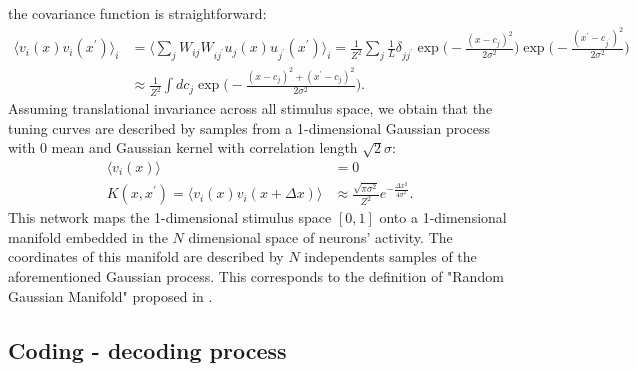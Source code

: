 \documentclass[a4paper]{article}%
\begin{document}
the covariance function is straightforward:
\begin{equation}%
\begin{split}
\langle v_{i}(x)v_{i}(x^{\prime}) \rangle_{i}  & = \Big\langle \sum_{j}
W_{ij}W_{ij^{\prime}} u_{j}(x)u_{j^{\prime}}(x^{\prime}) \Big\rangle_{i} =
\frac{1}{Z^{2}} \sum_{j} \frac{1}{L}\delta_{jj^{\prime}}\exp\Big(-\frac
{(x-c_{j})^{2}}{2\sigma^{2}} \Big) \exp\Big(-\frac{(x^{\prime}-c_{j^{\prime}%
})^{2}}{2\sigma^{2}}\Big)\\
& \approx\frac{1}{Z^{2} } \int dc_{j} \exp\Big(-\frac{(x-c_{j})^{2} +
(x^{\prime}-c_{j})^{2}}{2\sigma^{2}}\Big).
\end{split}
\end{equation}
Assuming translational invariance across all stimulus space, we obtain that
the tuning curves are described by samples from a 1-dimensional Gaussian
process with 0 mean and Gaussian kernel with correlation length $\sqrt
{2}\sigma$:
\begin{equation}%
\begin{split}
\langle v _{i} (x )\rangle & =0\\
K(x,x^{\prime}) = \langle v_{i}(x)v_{i}(x + \Delta x )\rangle & \approx
\frac{\sqrt{\pi\sigma^{2}}}{Z^{2}} e^{-\frac{\Delta x^{2}}{4 \sigma^{2}}}.
\end{split}
\end{equation}
This network maps the 1-dimensional stimulus space $[0,1]$ onto a
1-dimensional manifold embedded in the $N$ dimensional space of neurons'
activity. The coordinates of this manifold are described by $N$ independents
samples of the aforementioned Gaussian process. This corresponds to the
definition of "Random Gaussian Manifold" proposed in
\cite{Lahiri2016RandomManifolds,Gao2017AMeasurement}. \newline\newline

\subsection{Coding - decoding process}
\end{document}
